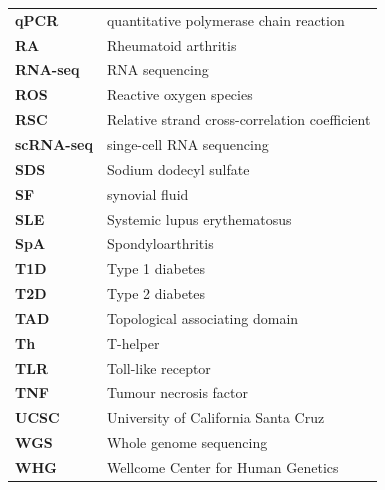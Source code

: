 \begin{longtable}{p{2.5cm}p{12.5cm}}
\textbf{qPCR} & quantitative polymerase chain reaction \\
\textbf{RA} & Rheumatoid arthritis \\
\textbf{RNA-seq} & RNA sequencing\\
\textbf{ROS}  & Reactive oxygen species \\
\textbf{RSC}  & Relative strand cross-correlation coefficient \\
\textbf{scRNA-seq} & singe-cell RNA sequencing \\
\textbf{SDS} & Sodium dodecyl sulfate \\
\textbf{SF} & synovial fluid \\
\textbf{SLE} & Systemic lupus erythematosus\\
\textbf{SpA} & Spondyloarthritis \\
\textbf{T1D} & Type 1 diabetes\\
\textbf{T2D} & Type 2 diabetes \\
\textbf{TAD} & Topological associating domain\\
\textbf{Th} & T-helper \\
\textbf{TLR} & Toll-like receptor\\
\textbf{TNF} & Tumour necrosis factor\\
\textbf{UCSC} & University of California Santa Cruz\\
\textbf{WGS} & Whole genome sequencing\\
\textbf{WHG} & Wellcome Center for Human Genetics\\
\end{longtable}
